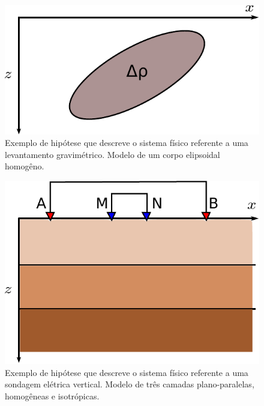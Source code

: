\begin{figure}
    \centering
    \includegraphics[scale=0.7]{figs/hipotese-grav}
    \caption{Exemplo de hipótese que descreve o sistema físico referente a uma
    levantamento gravimétrico.
    Modelo de um corpo elipsoidal homogêno.}
    \label{fig:hipotese-grav}
\end{figure}

\begin{figure}
    \centering
    \includegraphics[scale=0.7]{figs/hipotese-sev}
    \caption{Exemplo de hipótese que descreve o sistema físico referente a uma
    sondagem elétrica vertical.
    Modelo de três camadas plano-paralelas, homogêneas e isotrópicas.}
    \label{fig:hipotese-sev}
\end{figure}

